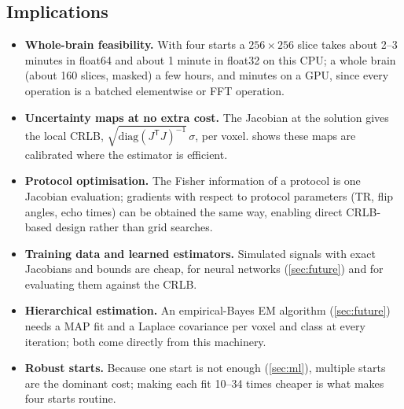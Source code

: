 \subsection{Implications}

\begin{itemize}
\item \textbf{Whole-brain feasibility.} With four starts a $256\times256$ slice takes about 2--3 minutes
  in float64 and about 1 minute in float32 on this CPU; a whole brain (about 160 slices,
  masked) a few hours, and minutes on a GPU, since every operation is a batched elementwise
  or FFT operation.
\item \textbf{Uncertainty maps at no extra cost.} The Jacobian at the solution gives the local CRLB,
  $\sqrt{\mathrm{diag}(J^{\mathsf T}J)^{-1}}\,\sigma$, per voxel.  shows these maps are
  calibrated where the estimator is efficient.
\item \textbf{Protocol optimisation.} The Fisher information of a protocol is one Jacobian
  evaluation; gradients with respect to protocol parameters (TR, flip angles, echo times) can
  be obtained the same way, enabling direct CRLB-based design rather than grid searches.
\item \textbf{Training data and learned estimators.} Simulated signals with exact Jacobians and
  bounds are cheap, for neural networks (\cref{sec:future}) and for evaluating them against
  the CRLB.
\item \textbf{Hierarchical estimation.} An empirical-Bayes EM algorithm (\cref{sec:future}) needs a
  MAP fit and a Laplace covariance per voxel and class at every iteration; both come directly
  from this machinery.
\item \textbf{Robust starts.} Because one start is not enough (\cref{sec:ml}), multiple starts are
  the dominant cost; making each fit 10--34 times cheaper is what makes four starts routine.
\end{itemize}
